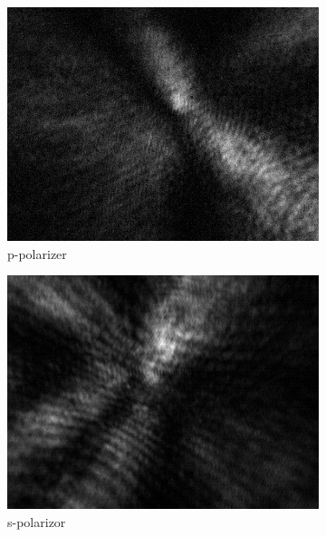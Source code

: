 \begin{figure}[!h]
\centering
  \begin{subfigure}[b]{0.2\textwidth}
    \includegraphics[width=\textwidth]{diffraction_image/2015040117594700004-1}
    \caption{p-polarizer}
  \end{subfigure}
  \begin{subfigure}[b]{0.2\textwidth}
    \includegraphics[width=\textwidth]{diffraction_image/2015040117594700004-2}
    \caption{s-polarizor}
  \end{subfigure}
  \begin{subfigure}[b]{0.2\textwidth}

\end{subfigure}
\end{figure}

